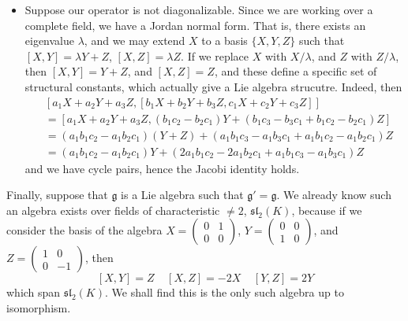 \begin{itemize}
    \item Suppose our operator is not diagonalizable. Since we are working over a complete field, we have a Jordan normal form. That is, there exists an eigenvalue $\lambda$, and we may extend $X$ to a basis $\{ X,Y,Z \}$ such that $[X,Y] = \lambda Y + Z$, $[X,Z] = \lambda Z$. If we replace $X$ with $X/\lambda$, and $Z$ with $Z/\lambda$, then $[X,Y] = Y + Z$, and $[X,Z] = Z$, and these define a specific set of structural constants, which actually give a Lie algebra strucutre. Indeed, then
    \begin{align*}
        &[a_1X + a_2Y + a_3Z, [b_1X + b_2Y + b_3Z, c_1X + c_2Y + c_3Z]]\\
        &= [a_1X + a_2Y + a_3Z, (b_1c_2 - b_2c_1) Y + (b_1c_3 - b_3c_1 + b_1c_2 - b_2c_1) Z]\\
        &= (a_1b_1c_2 - a_1 b_2c_1) (Y + Z) + (a_1 b_1c_3 - a_1 b_3 c_1 + a_1b_1c_2 - a_1b_2c_1) Z\\
        &= (a_1b_1c_2 - a_1b_2c_1) Y + (2a_1b_1c_2 - 2a_1b_2c_1 + a_1b_1c_3 - a_1b_3c_1) Z
    \end{align*}
    and we have cycle pairs, hence the Jacobi identity holds.
\end{itemize}

Finally, suppose that $\mathfrak{g}$ is a Lie algebra such that $\mathfrak{g}' = \mathfrak{g}$. We already know such an algebra exists over fields of characteristic $\neq 2$, $\mathfrak{sl}_2(K)$, because if we consider the basis of the algebra $X = \left( \begin{smallmatrix} 0 & 1 \\ 0 & 0 \end{smallmatrix} \right)$, $Y = \left( \begin{smallmatrix} 0 & 0 \\ 1 & 0 \end{smallmatrix} \right)$, and $Z = \left( \begin{smallmatrix} 1 & 0 \\ 0 & -1 \end{smallmatrix} \right)$, then
%
\[ [X,Y] = Z\ \ \ \ \ [X,Z] = -2X\ \ \ \ \ [Y,Z] = 2Y \]
%
which span $\mathfrak{sl}_2(K)$. We shall find this is the only such algebra up to isomorphism.

